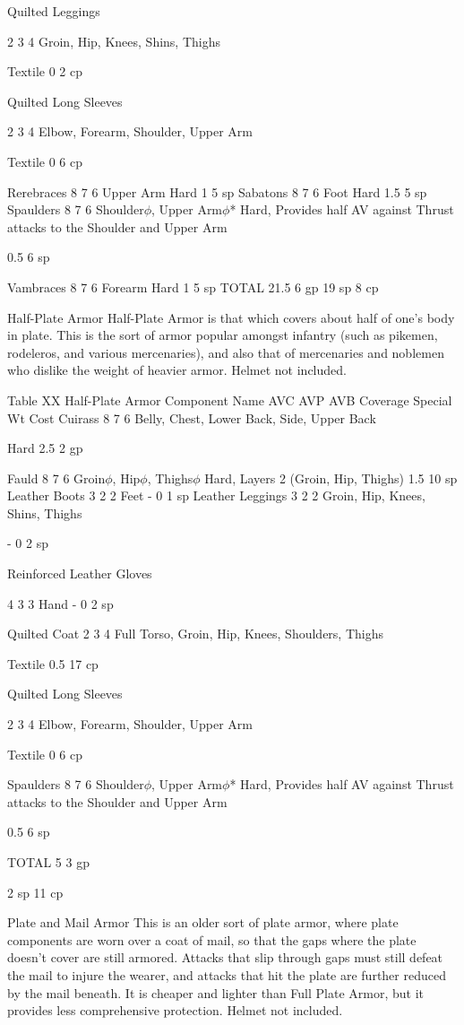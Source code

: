 \documentclass[oneside,11pt,english]{book}
\begin{document}
Quilted 
Leggings 

2 3 4 Groin, Hip, Knees, Shins, 
Thighs 

Textile 0 2 cp 

Quilted Long 
Sleeves 

2 3 4 Elbow, Forearm, Shoulder, 
Upper Arm 

Textile 0 6 cp 

Rerebraces 8 7 6 Upper Arm Hard 1 5 sp 
Sabatons 8 7 6 Foot Hard 1.5 5 sp 
Spaulders 8 7 6 Shoulder$\phi$, Upper Arm$\phi$* Hard, Provides half AV against Thrust 
attacks to the Shoulder and Upper Arm 

0.5 6 sp 

Vambraces 8 7 6 Forearm Hard 1 5 sp 
TOTAL 21.5 6 gp 
19 
sp 
8 cp 

 

Half-Plate Armor 
Half-Plate Armor is that which covers about half of one's body in plate. This is the sort of armor popular 
amongst infantry (such as pikemen, rodeleros, and various mercenaries), and also that of mercenaries and 
noblemen who dislike the weight of heavier armor. Helmet not included. 

 
Table XX Half-Plate Armor 
Component Name AVC AVP AVB Coverage Special Wt Cost 
Cuirass 8 7 6 Belly, Chest, Lower Back, 
Side, Upper Back 

Hard 2.5 2 gp 

Fauld 8 7 6 Groin$\phi$, Hip$\phi$, Thighs$\phi$ Hard, Layers 2 (Groin, Hip, Thighs) 1.5 10 
sp 
Leather Boots 3 2 2 Feet - 0 1 sp 
Leather Leggings 3 2 2 Groin, Hip, Knees, Shins, 
Thighs 

- 0 2 sp 

Reinforced 
Leather Gloves 

4 3 3 Hand - 0 2 sp 

Quilted Coat 2 3 4 Full Torso, Groin, Hip, 
Knees, Shoulders, Thighs 

Textile 0.5 17 
cp 

Quilted Long 
Sleeves 

2 3 4 Elbow, Forearm, Shoulder, 
Upper Arm 

Textile 0 6 cp 

Spaulders 8 7 6 Shoulder$\phi$, Upper Arm$\phi$* Hard, Provides half AV against 
Thrust attacks to the Shoulder and 
Upper Arm 

0.5 6 sp 

TOTAL 5 3 gp 


2 sp 
11 
cp 

 

Plate and Mail Armor 
This is an older sort of plate armor, where plate components are worn over a coat of mail, so that the gaps 
where the plate doesn’t cover are still armored. Attacks that slip through gaps must still defeat the mail to 
injure the wearer, and attacks that hit the plate are further reduced by the mail beneath. It is cheaper and 
lighter than Full Plate Armor, but it provides less comprehensive protection. Helmet not included. 
\end{document}
